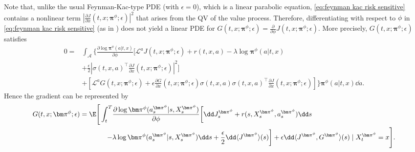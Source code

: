 Note that, unlike the usual Feynman-Kac-type PDE (with $\epsilon=0$), which is a linear parabolic equation, \eqref{eq:feynman kac risk sensitive} contains a nonlinear term $|\frac{\partial J}{\partial x}(t,x;\bm\pi^{\phi};\epsilon)|^2$ that arises from the QV of the value process. Therefore, differentiating with respect to $\phi$ in \eqref{eq:feynman kac risk sensitive} (as in \cite{jia2022policypg}) does not yield a linear PDE for $G(t,x;\bm\pi^{\phi};\epsilon) = \frac{\partial }{\partial \phi}J(t,x;\bm\pi^{\phi};\epsilon)$. More precisely, $G(t,x;\bm\pi^{\phi};\epsilon)$ satisfies
\[ \begin{aligned}
	0 = & \int_{\mathcal A}\Bigg\{ \frac{\partial \log\bm\pi^{\phi}(a|t,x)}{\partial \phi} \bigg[ \mathcal{L}^a J(t,x;\bm\pi^{\phi};\epsilon) + r(t,x,a) -\lambda\log \bm\pi^{\phi}(a|t,x) \\
	& +  \frac{\epsilon}{2} |\sigma(t,x,a)^\top\frac{\partial J}{\partial x}(t,x;\bm\pi^{\phi};\epsilon)|^2 \bigg]  \\
	& + \left[ \mathcal{L}^a G(t,x;\bm\pi^{\phi};\epsilon) +  \epsilon \frac{\partial G}{\partial x}(t,x;\bm\pi^{\phi};\epsilon) \sigma(t,x,a)\sigma(t,x,a)^\top\frac{\partial J}{\partial x}(t,x;\bm\pi^{\phi};\epsilon) \right] \Bigg\}\bm\pi^{\phi}(a|t,x)\dd a .
\end{aligned}  \]
Hence the gradient can be represented by
\begin{equation}
	\label{eq:pg risk sensitive}
	\begin{aligned}
		G(t,x;\bm\pi^{\phi};\epsilon) = \E\Bigg[\int_t^T & \frac{\partial \log\bm\pi^{\phi}(a_s^{\bm\pi^{\phi}}|s,X_s^{\bm\pi^{\phi}})}{\partial \phi}\bigg[ \dd J^{\bm\pi^{\phi}}_s + r(s,X_s^{\bm\pi^{\phi}},a_s^{\bm\pi^{\phi}})\dd s \\
		- &\lambda\log \bm\pi^{\phi}(a_s^{\bm\pi^{\phi}}|s,X_s^{\bm\pi^{\phi}})\dd s + \frac{\epsilon}{2}\dd \langle J^{\bm\pi^{\phi}} \rangle(s)  \bigg]
		+  \epsilon \dd \langle J^{\bm\pi^{\phi}}, G^{\bm\pi^{\phi}} \rangle(s) \mid X_t^{\bm\pi^{\phi}} = x \Bigg] .
	\end{aligned}
\end{equation} 

